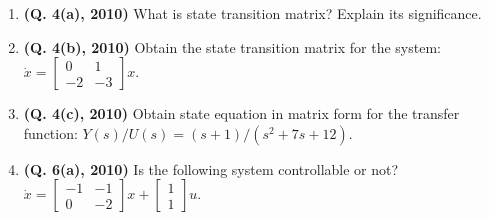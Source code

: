 \documentclass[12pt, a4paper]{article}
\begin{document}
\begin{enumerate}
		\item \textbf{(Q. 4(a), 2010)} What is state transition matrix? Explain its significance.
		\item \textbf{(Q. 4(b), 2010)} Obtain the state transition matrix for the system: $\dot{x} = \begin{bmatrix} 0 & 1 \\ -2 & -3 \end{bmatrix} x$.
		\item \textbf{(Q. 4(c), 2010)} Obtain state equation in matrix form for the transfer function: $Y(s)/U(s) = (s+1) / (s^2+7s+12)$.
		\item \textbf{(Q. 6(a), 2010)} Is the following system controllable or not? $\dot{x} = \begin{bmatrix} -1 & -1 \\ 0 & -2 \end{bmatrix} x + \begin{bmatrix} 1 \\ 1 \end{bmatrix} u$.
	\end{enumerate}
	
\end{document}
